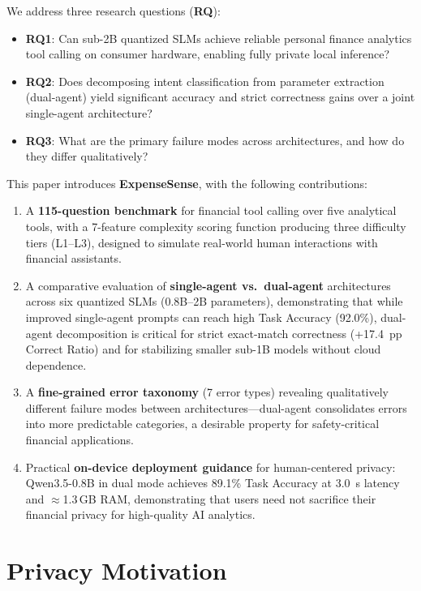 \documentclass[11pt,twocolumn]{article}
\begin{document}
We address three research questions (\textbf{RQ}):
\begin{itemize}
  \item \textbf{RQ1}: Can sub-2B quantized SLMs achieve reliable personal finance analytics tool calling on consumer hardware, enabling fully private local inference?
  \item \textbf{RQ2}: Does decomposing intent classification from parameter extraction (dual-agent) yield significant accuracy and strict correctness gains over a joint single-agent architecture?
  \item \textbf{RQ3}: What are the primary failure modes across architectures, and how do they differ qualitatively?
\end{itemize}

This paper introduces \textbf{ExpenseSense}, with the following contributions:

\begin{enumerate}
    \item A \textbf{115-question benchmark} for financial tool calling over five analytical tools, with a 7-feature complexity scoring function producing three difficulty tiers (L1--L3), designed to simulate real-world human interactions with financial assistants.
    \item A comparative evaluation of \textbf{single-agent vs.\ dual-agent} architectures across six quantized SLMs (0.8B--2B parameters), demonstrating that while improved single-agent prompts can reach high Task Accuracy (92.0\%), dual-agent decomposition is critical for strict exact-match correctness (+17.4~pp Correct Ratio) and for stabilizing smaller sub-1B models without cloud dependence.
    \item A \textbf{fine-grained error taxonomy} (7 error types) revealing qualitatively different failure modes between architectures---dual-agent consolidates errors into more predictable categories, a desirable property for safety-critical financial applications.
    \item Practical \textbf{on-device deployment guidance} for human-centered privacy: Qwen3.5-0.8B in dual mode achieves 89.1\% Task Accuracy at 3.0~s latency and $\approx$1.3\,GB RAM, demonstrating that users need not sacrifice their financial privacy for high-quality AI analytics.
\end{enumerate}

\section{Privacy Motivation}
\label{sec:privacy}
\end{document}
